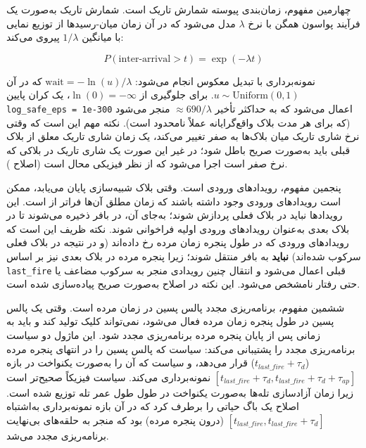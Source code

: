 چهارمین مفهوم، زمان‌بندی پیوسته شمارش تاریک  است. شمارش تاریک به‌صورت یک فرآیند پواسون همگن با نرخ $\lambda$ مدل می‌شود که در آن زمان میان-رسیدها از توزیع نمایی با میانگین $1/\lambda$ پیروی می‌کند:

\begin{equation}
	P(\text{inter-arrival} > t) = \exp(-\lambda t)
\end{equation}

نمونه‌برداری با تبدیل معکوس  انجام می‌شود: $\text{wait} = -\ln(u) / \lambda$ که در آن $u \sim \text{Uniform}(0, 1)$. برای جلوگیری از $\ln(0) = -\infty$، یک کران پایین \texttt{log\_safe\_eps = 1e-300} اعمال می‌شود که به حداکثر تأخیر $\approx 690/\lambda$ منجر می‌شود (که برای هر مدت بلاک واقع‌گرایانه عملاً نامحدود است). نکته مهم این است که وقتی نرخ شاری تاریک میان بلاک‌ها به صفر تغییر می‌کند، یک زمان شاری تاریک معلق از بلاک قبلی باید به‌صورت صریح باطل شود؛ در غیر این صورت یک شاری تاریک در بلاکی که نرخ صفر است اجرا می‌شود که از نظر فیزیکی محال است (اصلاح ).

پنجمین مفهوم،  رویدادهای ورودی است. وقتی بلاک شبیه‌سازی پایان می‌یابد، ممکن است رویدادهای ورودی وجود داشته باشند که زمان مطلق آن‌ها فراتر از  است. این رویدادها نباید در بلاک فعلی پردازش شوند؛ به‌جای آن، در بافر  ذخیره می‌شوند تا در بلاک بعدی به‌عنوان رویدادهای ورودی اولیه فراخوانی شوند. نکته ظریف این است که رویدادهای ورودی که در طول پنجره زمان مرده رخ داده‌اند (و در نتیجه در بلاک فعلی سرکوب شده‌اند) \textbf{نباید} به بافر  منتقل شوند؛ زیرا پنجره مرده در بلاک بعدی نیز بر اساس \texttt{last\_fire} قبلی اعمال می‌شود و انتقال چنین رویدادی منجر به سرکوب مضاعف یا حتی رفتار نامشخص می‌شود. این نکته در اصلاح  به‌صورت صریح پیاده‌سازی شده است.

ششمین مفهوم، برنامه‌ریزی مجدد پالس پسین در زمان مرده  است. وقتی یک پالس پسین در طول پنجره زمان مرده فعال می‌شود، نمی‌تواند کلیک تولید کند و باید به زمانی پس از پایان پنجره مرده برنامه‌ریزی مجدد شود. این ماژول دو سیاست برنامه‌ریزی مجدد را پشتیبانی می‌کند: سیاست  که پالس پسین را در انتهای پنجره مرده ($t_{last\_fire} + \tau_d$) قرار می‌دهد، و سیاست  که آن را به‌صورت یکنواخت در بازه $[t_{last\_fire} + \tau_d, t_{last\_fire} + \tau_d + \tau_{ap}]$ نمونه‌برداری می‌کند. سیاست  فیزیکاً صحیح‌تر است زیرا زمان آزادسازی تله‌ها به‌صورت یکنواخت در طول طول عمر تله توزیع شده است. اصلاح  یک باگ حیاتی را برطرف کرد که در آن بازه نمونه‌برداری به‌اشتباه $[t_{last\_fire}, t_{last\_fire} + \tau_d]$ (درون پنجره مرده) بود که منجر به حلقه‌های بی‌نهایت برنامه‌ریزی مجدد می‌شد.

